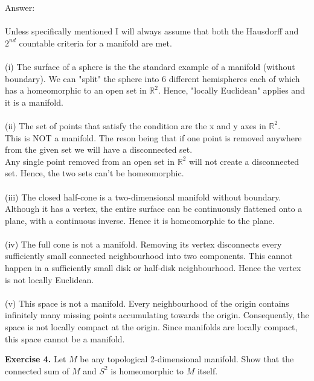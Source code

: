 \documentclass[12pt]{article}
\begin{document}
\vspace{1cm}
\noindent
Answer:\\
\\
Unless specifically mentioned I will always assume that both the Hausdorff and $2^{nd}$ countable criteria
for a manifold are met.\\
\\
(i) The surface of a sphere is the the standard example of a manifold (without boundary).  We can "split" the sphere into 6 different hemispheres each
of which has a homeomorphic to an open set in $\mathbb{R}^2$.  Hence, "locally Euclidean" applies and it is a manifold.\\
\\
(ii) The set of points that satisfy the condition are the x and y axes in $\mathbb{R}^2$.\\
This is NOT a manifold.  The reson being that if one point is removed anywhere from the given set we will have a disconnected set.\\
Any single point removed from an open set in $\mathbb{R}^2$ will not create a disconnected set.  Hence, the two sets can't be homeomorphic.\\
\\
(iii) 
The closed half-cone is a two-dimensional manifold without boundary. Although it has a vertex, the entire surface can be continuously flattened onto a 
plane, with a continuous inverse. Hence it is homeomorphic to the plane.\\
\\
(iv) The full cone is not a manifold. Removing its vertex disconnects every sufficiently small connected neighbourhood into two components. This cannot 
happen in a sufficiently small disk or half-disk neighbourhood. Hence the vertex is not locally Euclidean.\\
\\
(v) This space is not a manifold. Every neighbourhood of the origin contains infinitely many missing points accumulating towards the origin.
Consequently, the space is not locally compact at the origin. Since manifolds are locally compact, this space cannot be a manifold.


\newpage
\noindent
\textbf{Exercise 4.} Let $M$ be any topological 2-dimensional manifold.
Show that the connected sum of $M$ and $S^2$ is homeomorphic to $M$ itself.

\end{document}
